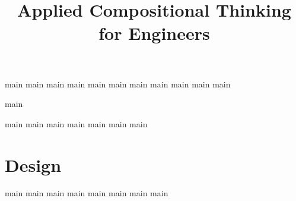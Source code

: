 

\pagestyle{scrheadings}

\ohead{\pagemark}
\ihead{\headmark}
\cfoot{}
\dominitoc
\doparttoc
\setcounter{parttocdepth}{0}
\setcounter{minitocdepth}{1}

\title{Applied Compositional Thinking\\ for Engineers}
\date{}



\setcounter{tocdepth}{1}



\tableofcontents


{main}
{main}
{main}
{main}
{main}
{main}
{main}
{main}
{main}
{main}
{main}

{main}

{main}
{main}
{main}
{main}
{main}
{main}
{main}


\part{Design}\label{part:co-design}

{main}
{main}
{main}
{main}
{main}
{main}
{main}
{main}


